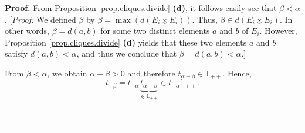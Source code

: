 \documentclass[numbers=enddot,12pt,final,onecolumn,notitlepage]{scrartcl}%
\theoremstyle{definition}
\newenvironment{proof}[1][Proof]{\noindent\textbf{#1.} }{\ \rule{0.5em}{0.5em}}
\newcommand{\timesu}{\mathbin{\underline{\times}}}
\theoremstyle{plainsl}
\begin{document}
\begin{proof}
From Proposition \ref{prop.cliques.divide} \textbf{(d)}, it follows easily see
that $\beta<\alpha$. [\textit{Proof:} We defined $\beta$ by $\beta=\max\left(
d\left(  E_{i}\timesu E_{i}\right)  \right)  $. Thus, $\beta\in d\left(
E_{i}\timesu E_{i}\right)  $. In other words, $\beta=d\left(  a,b\right)  $
for some two distinct elements $a$ and $b$ of $E_{i}$. However, Proposition
\ref{prop.cliques.divide} \textbf{(d)} yields that these two elements $a$ and
$b$ satisfy $d\left(  a,b\right)  <\alpha$, and thus we conclude that
$\beta=d\left(  a,b\right)  <\alpha$.]

From $\beta<\alpha$, we obtain $\alpha-\beta>0$ and therefore $t_{\alpha
-\beta}\in\mathbb{L}_{++}$. Hence,%
\begin{equation}
t_{-\beta}=t_{-\alpha}\underbrace{t_{\alpha-\beta}}_{\in\mathbb{L}_{++}}\in
t_{-\alpha}\mathbb{L}_{++}.\label{pf.thm.approx-p.t-beta}%
\end{equation}



\end{proof}
\end{document}
